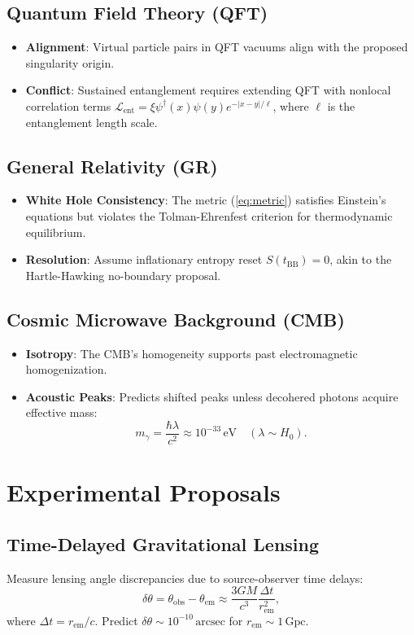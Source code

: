 \documentclass{article}
\begin{document}
\subsection{Quantum Field Theory (QFT)}
\begin{itemize}
\item \textbf{Alignment}: Virtual particle pairs in QFT vacuums align with the proposed singularity origin.
\item \textbf{Conflict}: Sustained entanglement requires extending QFT with nonlocal correlation terms \( \mathscr{L}_{\text{ent}} = \xi \psi^\dagger(x) \psi(y) e^{-|x-y|/\ell} \), where \( \ell \) is the entanglement length scale.
\end{itemize}

\subsection{General Relativity (GR)}
\begin{itemize}
\item \textbf{White Hole Consistency}: The metric (\ref{eq:metric}) satisfies Einstein's equations but violates the Tolman-Ehrenfest criterion for thermodynamic equilibrium.
\item \textbf{Resolution}: Assume inflationary entropy reset \( S(t_{\text{BB}}) = 0 \), akin to the Hartle-Hawking no-boundary proposal.
\end{itemize}

\subsection{Cosmic Microwave Background (CMB)}
\begin{itemize}
\item \textbf{Isotropy}: The CMB's homogeneity supports past electromagnetic homogenization.
\item \textbf{Acoustic Peaks}: Predicts shifted peaks unless decohered photons acquire effective mass:
\begin{equation}
m_{\gamma} = \frac{\hbar \lambda}{c^2} \approx 10^{-33} \, \text{eV} \quad (\lambda \sim H_0). \label{eq:photon_mass}
\end{equation}
\end{itemize}

\section{Experimental Proposals}
\subsection{Time-Delayed Gravitational Lensing}
Measure lensing angle discrepancies due to source-observer time delays:
\begin{equation}
\delta \theta = \theta_{\text{obs}} - \theta_{\text{em}} \approx \frac{3GM}{c^3} \frac{\Delta t}{r_{\text{em}}^2}, \label{eq:lensing}
\end{equation}
where \( \Delta t = r_{\text{em}}/c \). Predict \( \delta \theta \sim 10^{-10} \, \text{arcsec} \) for \( r_{\text{em}} \sim 1 \, \text{Gpc} \).
\end{document}
